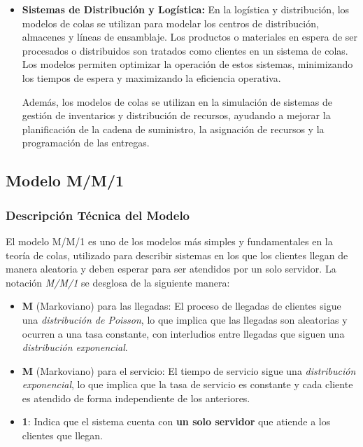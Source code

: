 \documentclass{article}
\begin{document}
\begin{itemize}
    \item \textbf{Sistemas de Distribución y Logística:}
    En la logística y distribución, los modelos de colas se utilizan para modelar los centros de distribución, almacenes y líneas de ensamblaje. Los productos o materiales en espera de ser procesados o distribuidos son tratados como clientes en un sistema de colas. Los modelos permiten optimizar la operación de estos sistemas, minimizando los tiempos de espera y maximizando la eficiencia operativa.

    Además, los modelos de colas se utilizan en la simulación de sistemas de gestión de inventarios y distribución de recursos, ayudando a mejorar la planificación de la cadena de suministro, la asignación de recursos y la programación de las entregas.

\end{itemize}

\subsection{Modelo M/M/1}
\subsubsection{Descripción Técnica del Modelo}

El modelo M/M/1 es uno de los modelos más simples y fundamentales en la teoría de colas, utilizado para describir sistemas en los que los clientes llegan de manera aleatoria y deben esperar para ser atendidos por un solo servidor. La notación \textit{M/M/1} se desglosa de la siguiente manera:

\begin{itemize}
    \item \textbf{M} (Markoviano) para las llegadas: El proceso de llegadas de clientes sigue una \textit{distribución de Poisson}, lo que implica que las llegadas son aleatorias y ocurren a una tasa constante, con interludios entre llegadas que siguen una \textit{distribución exponencial}.
    
    \item \textbf{M} (Markoviano) para el servicio: El tiempo de servicio sigue una \textit{distribución exponencial}, lo que implica que la tasa de servicio es constante y cada cliente es atendido de forma independiente de los anteriores.
    
    \item \textbf{1}: Indica que el sistema cuenta con \textbf{un solo servidor} que atiende a los clientes que llegan.
\end{itemize}
\end{document}
